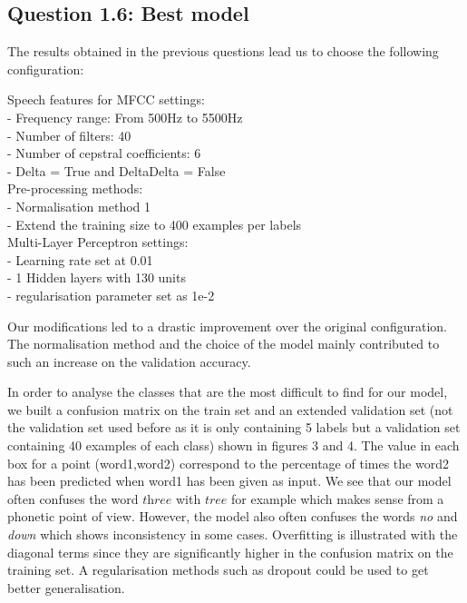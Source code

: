 \documentclass[9pt,twocolumn,letterpaper]{article}
\begin{document}
\subsection{Question 1.6: Best model}
The results obtained in the previous questions lead us to choose the following configuration:
\begin{flushleft}
Speech features for MFCC settings:\\
[2mm]
- Frequency range: From 500Hz to 5500Hz\\
[2mm]
- Number of filters: 40\\
[2mm]
- Number of cepstral coefficients: 6\\
[2mm]
- Delta = True and DeltaDelta = False\\
[2mm]
Pre-processing methods:\\
[2mm]
- Normalisation method 1\\
[2mm]
- Extend the training size to 400 examples per labels\\
[2mm]
Multi-Layer Perceptron settings:\\
[2mm]
- Learning rate set at 0.01\\
[2mm]
- 1 Hidden layers with 130 units\\
[2mm]
- regularisation parameter set as 1e-2
\end{flushleft}
Our modifications led to a drastic improvement over the original configuration. The normalisation method and the choice of the model mainly contributed to such an increase on the validation accuracy.\par
In order to analyse the classes that are the most difficult to find for our model, we built a confusion matrix on the train set and an extended validation set (not the validation set used before as it is only containing 5 labels but a validation set containing 40 examples of each class) shown in figures 3 and 4. The value in each box for a point (word1,word2) correspond to the percentage of times the word2 has been predicted when word1 has been given as input. We see that our model often confuses the word $\textit{three}$ with $\textit{tree}$ for example which makes sense from a phonetic point of view. However, the model also often confuses the words \textit{no} and \textit{down} which shows inconsistency in some cases. Overfitting is illustrated with the diagonal terms since they are significantly higher in the confusion matrix on the training set. A regularisation methods such as dropout could be used to get better generalisation.


\begin{table}
\begin{center}
\end{center}
\caption{{\bf Logistic Regression.} We tested the logisitic regression model on the validation set with different regularisation constants.}
\end{table}
\end{document}
